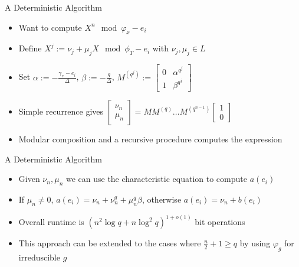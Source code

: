\documentclass{beamer}
\begin{document}
\begin{frame}{A Deterministic Algorithm}
\begin{itemize}
    \item Want to compute $X^n \mod \varphi_{x} - e_i$
    \item Define $X^j := \nu_j + \mu_j X \mod \phi_{T} - e_i$ with $\nu_j, \mu_j \in L$
    
    \item Set $\alpha := -\frac{\gamma_x - e_i}{\Delta}$, $\beta := - \frac{g}{\Delta}$, $M^{(q^j)} := \begin{bmatrix} 0 & \alpha^{q^j} \\ 1 & \beta^{q^j} \end{bmatrix}$
    
    \item Simple recurrence gives $\begin{bmatrix} \nu_{n} \\ \mu_n  \end{bmatrix} = M M^{(q)} \ldots M^{(q^{n-1})}  \begin{bmatrix} 1 \\ 0  \end{bmatrix}$
    
    \item Modular composition and a recursive procedure computes the expression 
    
    
    
\end{itemize}
    
\end{frame}


\begin{frame}{A Deterministic Algorithm}
\begin{itemize}
    \item Given $\nu_n, \mu_n$ we can use the characteristic equation to compute $a(e_i)$
        \item If $\mu_n \neq 0$, $a(e_i) = \nu_n + \nu_n^q + \mu_n^q \beta$, otherwise $a(e_i) = \nu_n + b(e_i)$
    \item Overall runtime is $(n^2 \log q + n \log^2 q)^{1+o(1)}$ bit operations

    \item This approach can be extended to the cases where $\frac{n}{2} + 1 \geq q$ by using $\varphi_{g}$ for irreduscible $g$
\end{itemize}
    
\end{frame}
\end{document}
